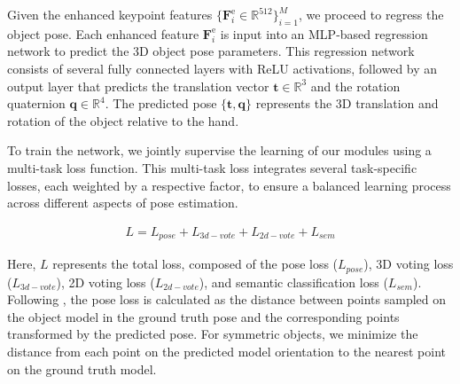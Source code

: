 Given the enhanced keypoint features $\{\mathbf{F}_i^{\text{e}} \in \mathbb{R}^{512}\}_{i=1}^M$, we proceed to regress the object pose. Each enhanced feature $\mathbf{F}_i^{\text{e}}$ is input into an MLP-based regression network to predict the 3D object pose parameters. This regression network consists of several fully connected layers with ReLU activations, followed by an output layer that predicts the translation vector $\mathbf{t} \in \mathbb{R}^{3}$ and the rotation quaternion $\mathbf{q} \in \mathbb{R}^{4}$. The predicted pose $\{\mathbf{t}, \mathbf{q}\}$ represents the 3D translation and rotation of the object relative to the hand.

To train the network, we jointly supervise the learning of our modules using a multi-task loss function. This multi-task loss integrates several task-specific losses, each weighted by a respective factor, to ensure a balanced learning process across different aspects of pose estimation.

\begin{align}
L = L_{pose} + L_{3d-vote} + L_{2d-vote} + L_{sem}
\label{eq:loss}
\end{align}

\noindent Here, \(L\) represents the total loss, composed of the pose loss (\(L_{pose}\)), 3D voting loss (\(L_{3d-vote}\)), 2D voting loss (\(L_{2d-vote}\)), and semantic classification loss (\(L_{sem}\)). Following \cite{wang2019densefusion}, the pose loss is calculated as the distance between points sampled on the object model in the ground truth pose and the corresponding points transformed by the predicted pose. For symmetric objects, we minimize the distance from each point on the predicted model orientation to the nearest point on the ground truth model.